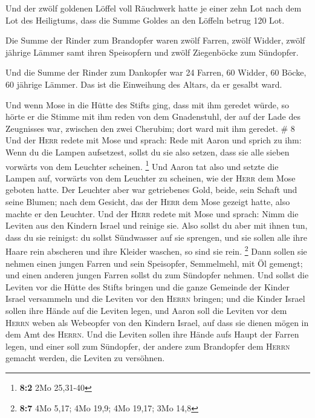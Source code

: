  Und der zwölf goldenen Löffel voll Räuchwerk hatte je
einer zehn Lot nach dem Lot des Heiligtums, dass die Summe Goldes an den
Löffeln betrug 120 Lot.

 Die Summe der Rinder zum Brandopfer waren zwölf Farren,
zwölf Widder, zwölf jährige Lämmer samt ihren Speisopfern und zwölf
Ziegenböcke zum Sündopfer.

 Und die Summe der Rinder zum Dankopfer war 24 Farren, 60
Widder, 60 Böcke, 60 jährige Lämmer. Das ist die Einweihung des Altars,
da er gesalbt ward.

 Und wenn Mose in die Hütte des Stifts ging, dass mit ihm
geredet würde, so hörte er die Stimme mit ihm reden von dem Gnadenstuhl,
der auf der Lade des Zeugnisses war, zwischen den zwei Cherubim; dort
ward mit ihm geredet. \# 8  Und der \textsc{Herr} redete
mit Mose und sprach:  Rede mit Aaron und sprich zu ihm:
Wenn du die Lampen aufsetzest, sollst du sie also setzen, dass sie alle
sieben vorwärts von dem Leuchter scheinen. \footnote{\textbf{8:2} 2Mo
  25,31-40}  Und Aaron tat also und setzte die Lampen auf,
vorwärts von dem Leuchter zu scheinen, wie der \textsc{Herr} dem Mose
geboten hatte.  Der Leuchter aber war getriebenes Gold,
beide, sein Schaft und seine Blumen; nach dem Gesicht, das der
\textsc{Herr} dem Mose gezeigt hatte, also machte er den Leuchter.
 Und der \textsc{Herr} redete mit Mose und sprach:
 Nimm die Leviten aus den Kindern Israel und reinige sie.
 Also sollst du aber mit ihnen tun, dass du sie reinigst:
du sollst Sündwasser auf sie sprengen, und sie sollen alle ihre Haare
rein abscheren und ihre Kleider waschen, so sind sie rein. \footnote{\textbf{8:7}
  4Mo 5,17; 4Mo 19,9; 4Mo 19,17; 3Mo 14,8}  Dann sollen
sie nehmen einen jungen Farren und sein Speisopfer, Semmelmehl, mit Öl
gemengt; und einen anderen jungen Farren sollst du zum Sündopfer nehmen.
 Und sollst die Leviten vor die Hütte des Stifts bringen
und die ganze Gemeinde der Kinder Israel versammeln  und
die Leviten vor den \textsc{Herrn} bringen; und die Kinder Israel sollen
ihre Hände auf die Leviten legen,  und Aaron soll die
Leviten vor dem \textsc{Herrn} weben als Webeopfer von den Kindern
Israel, auf dass sie dienen mögen in dem Amt des \textsc{Herrn}.
 Und die Leviten sollen ihre Hände aufs Haupt der Farren
legen, und einer soll zum Sündopfer, der andere zum Brandopfer dem
\textsc{Herrn} gemacht werden, die Leviten zu versöhnen. 
